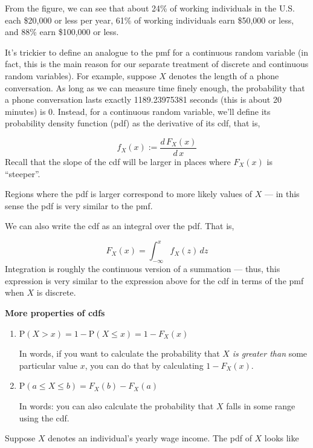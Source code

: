 \documentclass[
  letterpaper,
  DIV=11,
  numbers=noendperiod]{scrreprt}
\begin{document}
From the figure, we can see that about 24\% of working individuals in
the U.S. each \$20,000 or less per year, 61\% of working individuals
earn \$50,000 or less, and 88\% earn \$100,000 or less.

It's trickier to define an analogue to the pmf for a continuous random
variable (in fact, this is the main reason for our separate treatment of
discrete and continuous random variables). For example, suppose \(X\)
denotes the length of a phone conversation. As long as we can measure
time finely enough, the probability that a phone conversation lasts
exactly 1189.23975381 seconds (this is about 20 minutes) is 0. Instead,
for a continuous random variable, we'll define its probability density
function (pdf) as the derivative of its cdf, that is,

\[
  f_X(x) := \frac{d \, F_X(x)}{d \, x}
\] Recall that the slope of the cdf will be larger in places where
\(F_X(x)\) is ``steeper''.

Regions where the pdf is larger correspond to more likely values of
\(X\) --- in this sense the pdf is very similar to the pmf.

We can also write the cdf as an integral over the pdf. That is,

\[
  F_X(x) = \int_{-\infty}^x f_X(z) \, dz
\] Integration is roughly the continuous version of a summation ---
thus, this expression is very similar to the expression above for the
cdf in terms of the pmf when \(X\) is discrete.

\textbf{More properties of cdfs}

\begin{enumerate}
\def\labelenumi{\arabic{enumi}.}
\setcounter{enumi}{3}
\item
  \(\mathrm{P}(X > x) = 1 - \mathrm{P}(X \leq x) = 1-F_X(x)\)

  In words, if you want to calculate the probability that \(X\) \emph{is
  greater than} some particular value \(x\), you can do that by
  calculating \(1-F_X(x)\).
\item
  \(\mathrm{P}(a \leq X \leq b) = F_X(b) - F_X(a)\)

  In words: you can also calculate the probability that \(X\) falls in
  some range using the cdf.
\end{enumerate}

Suppose \(X\) denotes an individual's yearly wage income. The pdf of
\(X\) looks like
\end{document}
